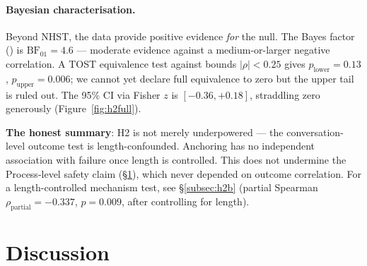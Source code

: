 \documentclass{article}
\begin{document}
\paragraph{Bayesian characterisation.}
Beyond NHST, the data provide positive evidence \emph{for} the null.
The Bayes factor (\citealt{wagenmakers2018}) is $\mathrm{BF}_{01} = 4.6$
--- moderate evidence against a medium-or-larger negative correlation.
A TOST equivalence test \citep{lakens2018} against bounds $|\rho| < 0.25$
gives $p_{\text{lower}} = 0.13$, $p_{\text{upper}} = 0.006$; we cannot
yet declare full equivalence to zero but the upper tail is ruled out.
The 95\% CI via Fisher $z$ is $[-0.36, +0.18]$, straddling zero
generously (Figure~\ref{fig:h2full}).

\textbf{The honest summary}: H2 is not merely underpowered ---
the conversation-level outcome test is length-confounded.
Anchoring has no independent association with failure once length is
controlled.
This does not undermine the Process-level safety claim
(\S\ref{sec:discussion}), which never depended on outcome correlation.
For a length-controlled mechanism test, see \S\ref{subsec:h2b}
(partial Spearman $\rho_{\text{partial}} = -0.337$, $p = 0.009$,
after controlling for length).



\section{Discussion}
\label{sec:discussion}
\end{document}
